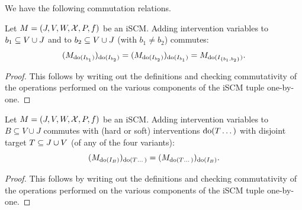 We have the following commutation relations.
\begin{Prp}\label{prp:adding_intervention_variables_one_by_one}
Let $M = \left ( J, V, W, \mathcal{X}, P, f \right )$ be an iSCM.
Adding intervention variables to $b_1 \subseteq V \cup J$ and to $b_2 \subseteq V \cup J$ (with $b_1 \ne b_2$) commutes:
  $$(M_{\operatorname{do}(I_{b_1})})_{\operatorname{do}(I_{b_2})} = (M_{\operatorname{do}(I_{b_2})})_{\operatorname{do}(I_{b_1})} = M_{\operatorname{do}(I_{\{b_1,b_2\}})}.$$
\end{Prp}
\begin{proof}
  This follows by writing out the definitions and checking commutativity of the operations performed on the various components of the iSCM tuple one-by-one.
\end{proof}
\begin{Prp}\label{prp:adding_intervention_variables_commutes}
Let $M = \left ( J, V, W, \mathcal{X}, P, f \right )$ be an iSCM.
Adding intervention variables to $B \subseteq V \cup J$ commutes with (hard or soft) interventions $\operatorname{do}(T\dots)$ with disjoint target $T \subseteq J \cup V$ (of any of the four variants):
  $$(M_{\operatorname{do}(I_B)})_{\operatorname{do}(T\dots)} = (M_{\operatorname{do}(T\dots)})_{\operatorname{do}(I_B)}.$$
\end{Prp}
\begin{proof}
  This follows by writing out the definitions and checking commutativity of the operations performed on the various components of the iSCM tuple one-by-one.
\end{proof}


